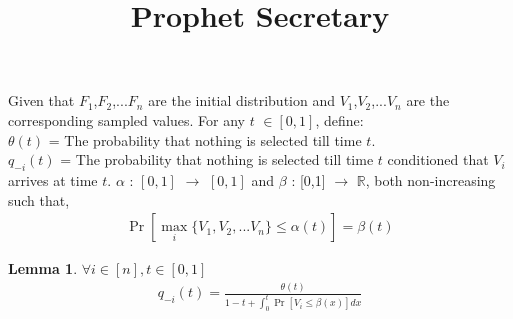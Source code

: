 \documentclass[10pt, letterpaper, twoside]{article}
\title{Prophet Secretary}
\newtheorem{lemma}[theorem]{Lemma}
\begin{document}
	
	\maketitle
	Given that $F_{1}$,$F_{2}$,...$F_{n}$ are the initial distribution and $V_{1}$,$V_{2}$,...$V_{n}$ are the corresponding sampled values. For any $t$ $\in [0,1] $, define:\\
	$\theta(t)$ = The probability that nothing is selected till time $t$.\\
	$q_{-i}(t)$ = The probability that nothing is selected till time $t$ conditioned that $V_{i}$ arrives at time $t$.
	$\alpha$ : $[0,1]$ $\rightarrow$ $[0,1]$ and $\beta$ : [0,1] $\rightarrow$ $\mathbb{R}$, both non-increasing such that,
	\begin{align*}
		\Pr[\max_{i} \{V_{1},V_{2},...V_{n}\} \leq \alpha(t)] = \beta(t)
	\end{align*}
\begin{lemma} $\forall i \in [n], t \in [0,1]$
	\begin{align*}
		q_{-i}(t) = \frac{\theta(t)}{1-t+\int_{0}^{t} \Pr[V_{i} \leq \beta(x)]  dx}
	\end{align*}
\end{lemma}
\end{document}
